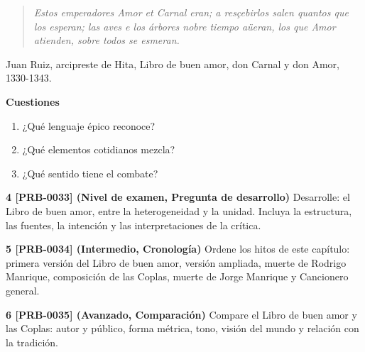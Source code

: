 \documentclass{book}
\begin{document}
\begin{tcolorbox}[title={Ejercicios}, studiumworked, breakable]
\begin{quote}
\itshape Estos emperadores Amor et Carnal eran; a resçebirlos salen quantos que los esperan; las aves e los árbores nobre tiempo aüeran, los que Amor atienden, sobre todos se esmeran.
\end{quote}
{\noindent\footnotesize Juan Ruiz, arcipreste de Hita, Libro de buen amor, don Carnal y don Amor, 1330-1343.\par}

\noindent\textbf{Cuestiones}
\begin{enumerate}
\item ¿Qué lenguaje épico reconoce?
\item ¿Qué elementos cotidianos mezcla?
\item ¿Qué sentido tiene el combate?
\end{enumerate}

\noindent\textbf{4 [PRB-0033] (Nivel de examen, Pregunta de desarrollo)}
Desarrolle: el Libro de buen amor, entre la heterogeneidad y la unidad. Incluya la estructura, las fuentes, la intención y las interpretaciones de la crítica.


\noindent\textbf{5 [PRB-0034] (Intermedio, Cronología)}
Ordene los hitos de este capítulo: primera versión del Libro de buen amor, versión ampliada, muerte de Rodrigo Manrique, composición de las Coplas, muerte de Jorge Manrique y Cancionero general.


\noindent\textbf{6 [PRB-0035] (Avanzado, Comparación)}
Compare el Libro de buen amor y las Coplas: autor y público, forma métrica, tono, visión del mundo y relación con la tradición.

\end{tcolorbox}
\end{document}
